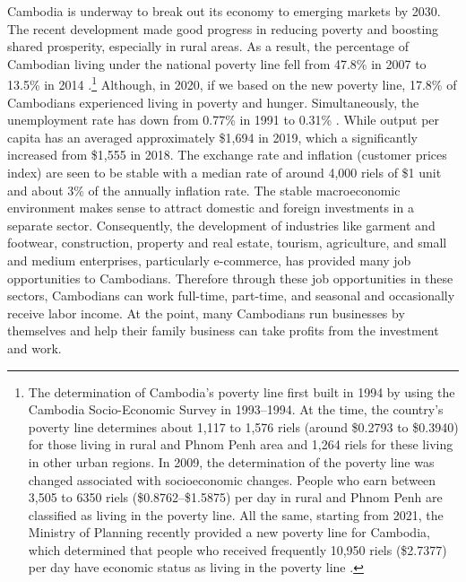 \documentclass[11pt,letterpaper]{article}
\begin{document}
Cambodia is underway to break out its economy to emerging markets by 2030. The recent development made good progress in reducing poverty and boosting shared prosperity, especially in rural areas. As a result, the percentage of Cambodian living under the national poverty line fell from 47.8\% in 2007 to 13.5\% in 2014 \cite{NIS2021}.\footnote{The determination of Cambodia's poverty line first built in 1994 by using the Cambodia Socio-Economic Survey in 1993--1994. At the time, the country's poverty line determines about 1,117 to 1,576 riels (around \$0.2793 to \$0.3940) for those living in rural and Phnom Penh area and 1,264 riels for these living in other urban regions. In 2009, the determination of the poverty line was changed associated with socioeconomic changes. People who earn between 3,505 to 6350 riels (\$0.8762--\$1.5875) per day in rural and Phnom Penh are classified as living in the poverty line. All the same, starting from 2021, the Ministry of Planning recently provided a new poverty line for Cambodia, which determined that people who received frequently 10,950 riels (\$2.7377) per day have economic status as living in the poverty line \cite{NIS2021}.} Although, in 2020, if we based on the new poverty line, 17.8\% of Cambodians experienced living in poverty and hunger. Simultaneously, the unemployment rate has down from 0.77\% in 1991 to 0.31\% \cite{ILO2021}. While output per capita has an averaged approximately \$1,694 in 2019, which a significantly increased from \$1,555 in 2018. The exchange rate and inflation (customer prices index) are seen to be stable with a median rate of around 4,000 riels of \$1 unit and about 3\% of the annually inflation rate. The stable macroeconomic environment makes sense to attract domestic and foreign investments in a separate sector. Consequently, the development of industries like garment and footwear, construction, property and real estate, tourism, agriculture, and small and medium enterprises, particularly e-commerce, has provided many job opportunities to Cambodians. Therefore through these job opportunities in these sectors, Cambodians can work full-time, part-time, and seasonal and occasionally receive labor income. At the point, many Cambodians run businesses by themselves and help their family business can take profits from the investment and work.  
\end{document}
